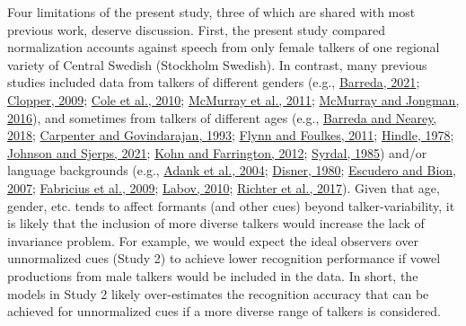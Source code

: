 \documentclass[utf8]{frontiersSCNS}
\begin{document}
Four limitations of the present study, three of which are shared with most previous work, deserve discussion. First, the present study compared normalization accounts against speech from only female talkers of one regional variety of Central Swedish (Stockholm Swedish). In contrast, many previous studies included data from talkers of different genders (e.g., \protect\hyperlink{ref-barreda2021}{Barreda, 2021}; \protect\hyperlink{ref-clopper2009}{Clopper, 2009}; \protect\hyperlink{ref-cole2010}{Cole et al., 2010}; \protect\hyperlink{ref-mcmurray2011}{McMurray et al., 2011}; \protect\hyperlink{ref-mcmurray-jongman2016}{McMurray and Jongman, 2016}), and sometimes from talkers of different ages (e.g., \protect\hyperlink{ref-barreda2018a}{Barreda and Nearey, 2018}; \protect\hyperlink{ref-carpenter1993}{Carpenter and Govindarajan, 1993}; \protect\hyperlink{ref-Flynn2011}{Flynn and Foulkes, 2011}; \protect\hyperlink{ref-hindle1978}{Hindle, 1978}; \protect\hyperlink{ref-johnson-sjerps2021}{Johnson and Sjerps, 2021}; \protect\hyperlink{ref-kohn2012a}{Kohn and Farrington, 2012}; \protect\hyperlink{ref-syrda1985}{Syrdal, 1985}) and/or language backgrounds (e.g., \protect\hyperlink{ref-adank2004}{Adank et al., 2004}; \protect\hyperlink{ref-disner1980}{Disner, 1980}; \protect\hyperlink{ref-escudero2007}{Escudero and Bion, 2007}; \protect\hyperlink{ref-fabricius2009}{Fabricius et al., 2009}; \protect\hyperlink{ref-labov2010}{Labov, 2010}; \protect\hyperlink{ref-richter2017}{Richter et al., 2017}). Given that age, gender, etc. tends to affect formants (and other cues) beyond talker-variability, it is likely that the inclusion of more diverse talkers would increase the lack of invariance problem. For example, we would expect the ideal observers over unnormalized cues (Study 2) to achieve lower recognition performance if vowel productions from male talkers would be included in the data. In short, the models in Study 2 likely over-estimates the recognition accuracy that can be achieved for unnormalized cues if a more diverse range of talkers is considered.
\end{document}
